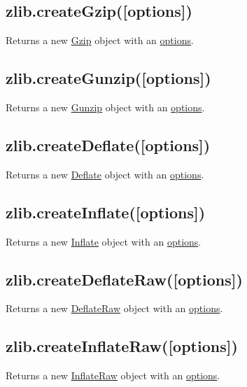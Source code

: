 \subsection{zlib.createGzip({[}options{]})}\label{zlib.creategzipoptions}

Returns a new \hyperref[zlibux5fclassux5fzlibux5fgzip]{Gzip} object with
an \hyperref[zlibux5foptions]{options}.

\subsection{zlib.createGunzip({[}options{]})}\label{zlib.creategunzipoptions}

Returns a new \hyperref[zlibux5fclassux5fzlibux5fgunzip]{Gunzip} object
with an \hyperref[zlibux5foptions]{options}.

\subsection{zlib.createDeflate({[}options{]})}\label{zlib.createdeflateoptions}

Returns a new \hyperref[zlibux5fclassux5fzlibux5fdeflate]{Deflate}
object with an \hyperref[zlibux5foptions]{options}.

\subsection{zlib.createInflate({[}options{]})}\label{zlib.createinflateoptions}

Returns a new \hyperref[zlibux5fclassux5fzlibux5finflate]{Inflate}
object with an \hyperref[zlibux5foptions]{options}.

\subsection{zlib.createDeflateRaw({[}options{]})}\label{zlib.createdeflaterawoptions}

Returns a new \hyperref[zlibux5fclassux5fzlibux5fdeflateraw]{DeflateRaw}
object with an \hyperref[zlibux5foptions]{options}.

\subsection{zlib.createInflateRaw({[}options{]})}\label{zlib.createinflaterawoptions}

Returns a new \hyperref[zlibux5fclassux5fzlibux5finflateraw]{InflateRaw}
object with an \hyperref[zlibux5foptions]{options}.

